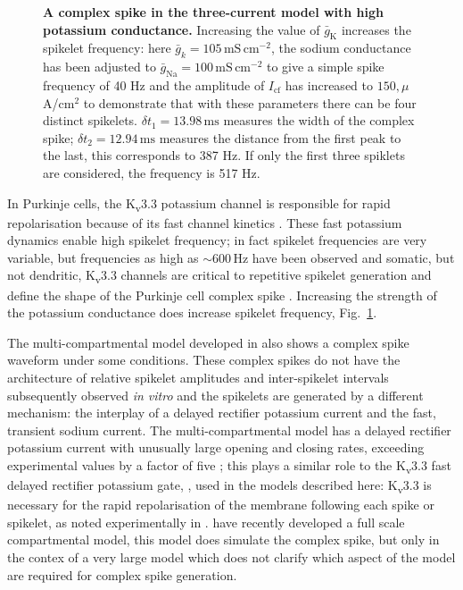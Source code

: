 \documentclass[twocolumn]{svjour3}          %
\newcommand{\msi}{\,\mathrm{mS\,cm^{-2}}}
\newcommand{\mse}{\,\mathrm{ms}}
\newcommand{\hz}{\,\mathrm{Hz}}
\renewcommand{\k}{\mathrm{K}}
\newcommand{\na}{\mathrm{Na}}
\newcommand{\cf}{\mathrm{cf}}
\begin{document}
\begin{figure}[!ht]
    
\caption{\textbf{A complex spike in the three-current model with high
    potassium conductance.}  Increasing the value of $\bar{g}_\k$
  increases the spikelet frequency: here $\bar{g}_k=105\msi$, the
  sodium conductance has been adjusted to $\bar{g}_\na=100\msi$ to
  give a simple spike frequency of 40 Hz and the amplitude of $I_\cf$
  has increased to $150,\mu$A/cm$^2$ to demonstrate that with these
  parameters there can be four distinct spikelets. $\delta t_1=13.98\mse$
  measures the width of the complex spike; $\delta t_2=12.94\mse$ measures the
  distance from the first peak to the last, this corresponds to 387 Hz. If only the first three spiklets are considered, the frequency is 517 Hz.}
\label{fig_cs_high_k}
\end{figure}

In Purkinje cells, the K\textsubscript{v}3.3 potassium channel is
responsible for rapid repolarisation \citep{VeysEtAl2013} because of
its fast channel kinetics \citep{RudyEtAl1999,RudyMcBain2001}. These
fast potassium dynamics enable high spikelet frequency; in fact
spikelet frequencies are very variable, but frequencies as high as
$\sim 600\hz$ have been observed
\citep{WarnaarEtAl2015,BurroughsEtAl2016} and somatic, but not
dendritic, K\textsubscript{v}3.3 channels are critical to repetitive
spikelet generation and define the shape of the Purkinje cell complex
spike \citep{HurlockEtAl2008,ZaghaEtAl2008,VeysEtAl2013}. Increasing
the strength of the potassium conductance does increase spikelet
frequency, Fig.~\ref{fig_cs_high_k}.

The multi-compartmental model developed in
\citet{DeSchutterBower1994a,DeSchutterBower1994b,DeSchutterBower1994c}
also shows a complex spike waveform under some conditions. These
complex spikes do not have the architecture of relative spikelet
amplitudes and inter-spikelet intervals subsequently observed
\textit{in vitro} and the spikelets are generated by a different
mechanism: the interplay of a delayed rectifier potassium current and
the fast, transient sodium current. The multi-compartmental model has
a delayed rectifier potassium current with unusually large opening and
closing rates, exceeding experimental values by a factor of five
\citep{YamadaEtAl1989}; this plays a similar role to the
K\textsubscript{v}3.3 fast delayed rectifier potassium gate,
\citep{VeysEtAl2013,ZaghaEtAl2008}, used in the models described here:
K\textsubscript{v}3.3 is necessary for the rapid repolarisation of the
membrane following each spike or spikelet, as noted experimentally in
\citet{ZaghaEtAl2008,VeysEtAl2013}. \citet{ZangEtAl2018} have recently
developed a full scale compartmental model, this model does simulate
the complex spike, but only in the contex of a very large model which
does not clarify which aspect of the model are required for complex
spike generation.
\end{document}
